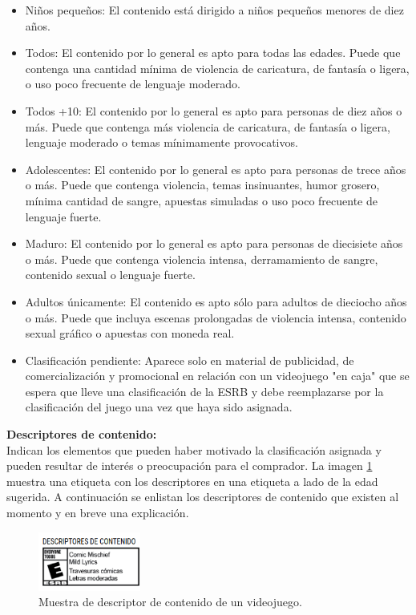			\begin{itemize}
			\item Niños pequeños: 
			El contenido está dirigido a niños pequeños menores de diez años.
			
			\item Todos: 
			El contenido por lo general es apto para todas las edades. Puede que contenga una cantidad mínima de violencia de caricatura, de fantasía o ligera, o uso poco frecuente de lenguaje moderado.
			
			\item Todos +10: 
			El contenido por lo general es apto para personas de diez años o más. Puede que contenga más violencia de caricatura, de fantasía o ligera, lenguaje moderado o temas mínimamente provocativos.
			
			\item Adolescentes: 
			El contenido por lo general es apto para personas de trece años o más. Puede que contenga violencia, temas insinuantes, humor grosero, mínima cantidad de sangre, apuestas simuladas o uso poco frecuente de lenguaje fuerte.
			
			\item Maduro: 
			El contenido por lo general es apto para personas de diecisiete años o más. Puede que contenga violencia intensa, derramamiento de sangre, contenido sexual o lenguaje fuerte.
			
			\item Adultos únicamente: 
			El contenido es apto sólo para adultos de dieciocho años o más. Puede que incluya escenas prolongadas de violencia intensa, contenido sexual gráfico o apuestas con moneda real.
			
			\item Clasificación pendiente: 
			Aparece solo en material de publicidad, de comercialización y promocional en relación con un videojuego "en caja" que se espera que lleve una clasificación de la ESRB y debe reemplazarse por la clasificación del juego una vez que haya sido asignada.
			
		\end{itemize}		
			
			\textbf{Descriptores de contenido: } 
			\\[1pt]
			Indican los elementos que pueden haber motivado la clasificación asignada y pueden resultar de interés o preocupación para el comprador. La imagen \ref{fig:clasDes} muestra una etiqueta con los descriptores en una etiqueta a lado de la edad sugerida. A continuación se enlistan los descriptores de contenido que existen al momento y en breve una explicación. 
			\\[1pt]
				\begin{figure}
				\centering
				\includegraphics[width=0.3\textwidth]{03MarcoTeorico/imageR/clasDes}
				\caption{Muestra de descriptor de contenido de un videojuego.}
				\label{fig:clasDes}
			\end{figure}
			
